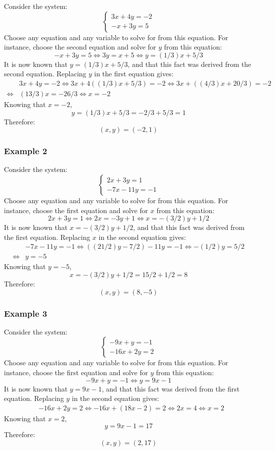 \documentclass{article}
\begin{document}
Consider the system:
\[\left\{\begin{array}{c} 
3x + 4y = -2 \\
-x + 3y = 5
\end{array}\right.\] 
Choose any equation and any variable to solve for from this equation. For instance, choose the second equation and solve for \(y\) from this equation:
\[-x + 3y = 5 \iff 3y = x + 5 \iff y = (1/3)x + 5/3\]
It is now known that \(y = (1/3)x + 5/3\), and that this fact was derived from the second equation. Replacing \(y\) in the first equation gives:
\begin{align*}
& 3x + 4y = -2 
\iff 3x + 4((1/3)x + 5/3) = -2 
\iff 3x + ((4/3)x + 20/3) = -2 \\
\iff & (13/3)x = -26/3 \iff x = -2
\end{align*}
Knowing that \(x = -2\), 
\[y = (1/3)x + 5/3 = -2/3 + 5/3 = 1\]
Therefore:
\[(x, y) = (-2, 1)\] 


\subsubsection*{Example 2}

Consider the system:
\[\left\{\begin{array}{c} 
2x + 3y = 1 \\
-7x - 11y = -1
\end{array}\right.\] 
Choose any equation and any variable to solve for from this equation. For instance, choose the first equation and solve for \(x\) from this equation:
\[2x + 3y = 1 \iff 2x = -3y + 1 \iff x = -(3/2)y + 1/2\]
It is now known that \(x = -(3/2)y + 1/2\), and that this fact was derived from the first equation. Replacing \(x\) in the second equation gives:
\begin{align*}
& -7x - 11y = -1 
\iff ((21/2)y - 7/2) - 11y = -1 
\iff -(1/2)y = 5/2 \\
\iff & y = -5
\end{align*}
Knowing that \(y = -5\), 
\[x = -(3/2)y + 1/2 = 15/2 + 1/2 = 8\]  
Therefore:
\[(x, y) = (8, -5)\]


\subsubsection*{Example 3}

Consider the system:
\[\left\{\begin{array}{c} 
-9x + y = -1 \\
-16x + 2y = 2
\end{array}\right.\] 
Choose any equation and any variable to solve for from this equation. For instance, choose the first equation and solve for \(y\) from this equation:
\[-9x + y = -1 \iff y = 9x - 1\]
It is now known that \(y = 9x - 1\), and that this fact was derived from the first equation. Replacing \(y\) in the second equation gives:
\begin{align*}
& -16x + 2y = 2 
\iff -16x + (18x - 2) = 2 
\iff 2x = 4 
\iff x = 2
\end{align*}
Knowing that \(x = 2\), 
\[y = 9x - 1 = 17\]
Therefore:
\[(x, y) = (2, 17)\]
\end{document}
